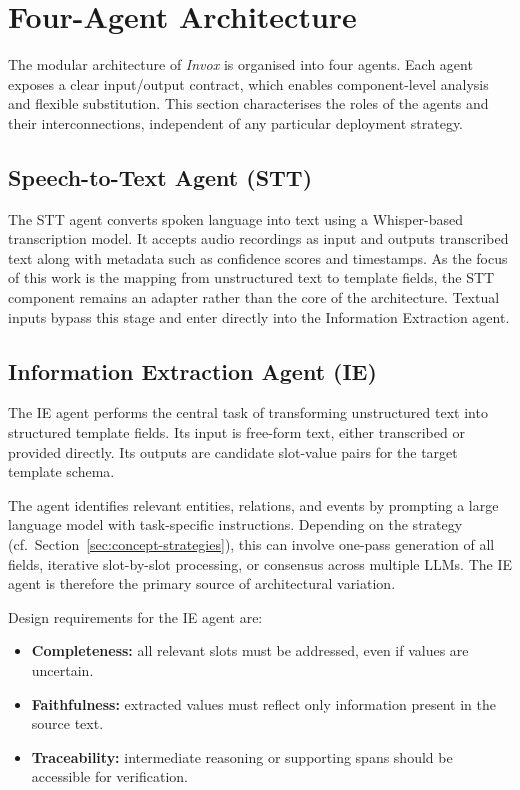 \section{Four-Agent Architecture}
\label{sec:concept-architecture}

The modular architecture of \textit{Invox} is organised into four agents. Each agent exposes a clear input/output contract, which enables component-level analysis and flexible substitution. This section characterises the roles of the agents and their interconnections, independent of any particular deployment strategy.

\subsection{Speech-to-Text Agent (STT)}
The STT agent converts spoken language into text using a Whisper-based transcription model. It accepts audio recordings as input and outputs transcribed text along with metadata such as confidence scores and timestamps. As the focus of this work is the mapping from unstructured text to template fields, the STT component remains an adapter rather than the core of the architecture. Textual inputs bypass this stage and enter directly into the Information Extraction agent.

\subsection{Information Extraction Agent (IE)}
The IE agent performs the central task of transforming unstructured text into structured template fields. Its input is free-form text, either transcribed or provided directly. Its outputs are candidate slot-value pairs for the target template schema.

The agent identifies relevant entities, relations, and events by prompting a large language model with task-specific instructions. Depending on the strategy (cf.~Section~\ref{sec:concept-strategies}), this can involve one-pass generation of all fields, iterative slot-by-slot processing, or consensus across multiple LLMs. The IE agent is therefore the primary source of architectural variation. 

Design requirements for the IE agent are:
\begin{itemize}
    \item \textbf{Completeness:} all relevant slots must be addressed, even if values are uncertain.
    \item \textbf{Faithfulness:} extracted values must reflect only information present in the source text.
    \item \textbf{Traceability:} intermediate reasoning or supporting spans should be accessible for verification.
\end{itemize}

